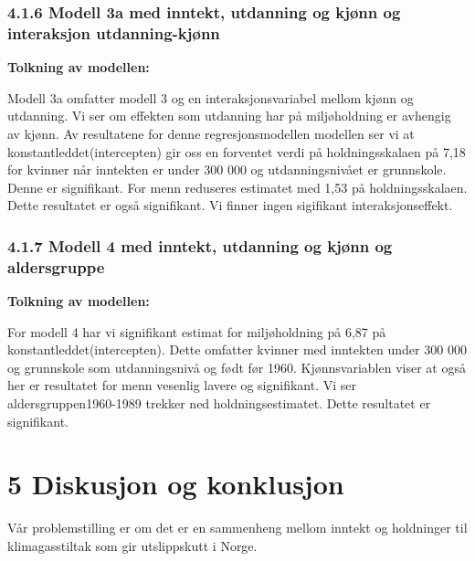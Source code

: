 \documentclass[
  12pt,
  letterpaper,
  DIV=11,
  numbers=noendperiod]{scrartcl}
\begin{document}
\hypertarget{modell-3a-med-inntekt-utdanning-og-kjuxf8nn-og-interaksjon-utdanning-kjuxf8nn}{%
\subsubsection{4.1.6 Modell 3a med inntekt, utdanning og kjønn og
interaksjon
utdanning-kjønn}\label{modell-3a-med-inntekt-utdanning-og-kjuxf8nn-og-interaksjon-utdanning-kjuxf8nn}}

\textbf{Tolkning av modellen:}

Modell 3a omfatter modell 3 og en interaksjonsvariabel mellom kjønn og
utdanning. Vi ser om effekten som utdanning har på miljøholdning er
avhengig av kjønn. Av resultatene for denne regresjonsmodellen modellen
ser vi at konstantleddet(intercepten) gir oss en forventet verdi på
holdningsskalaen på 7,18 for kvinner når inntekten er under 300 000 og
utdanningsnivået er grunnskole. Denne er signifikant. For menn reduseres
estimatet med 1,53 på holdningsskalaen. Dette resultatet er også
signifikant. Vi finner ingen sigifikant interaksjonseffekt.

\hypertarget{modell-4-med-inntekt-utdanning-og-kjuxf8nn-og-aldersgruppe}{%
\subsubsection{4.1.7 Modell 4 med inntekt, utdanning og kjønn og
aldersgruppe}\label{modell-4-med-inntekt-utdanning-og-kjuxf8nn-og-aldersgruppe}}

\textbf{Tolkning av modellen:}

For modell 4 har vi signifikant estimat for miljøholdning på 6,87 på
konstantleddet(intercepten). Dette omfatter kvinner med inntekten under
300 000 og grunnskole som utdanningsnivå og født før 1960.
Kjønnsvariablen viser at også her er resultatet for menn vesenlig lavere
og signifikant. Vi ser aldersgruppen1960-1989 trekker ned
holdningsestimatet. Dette resultatet er signifikant.

\newpage

\hypertarget{diskusjon-og-konklusjon}{%
\section{5 Diskusjon og konklusjon}\label{diskusjon-og-konklusjon}}

Vår problemstilling er om det er en sammenheng mellom inntekt og
holdninger til klimagasstiltak som gir utslippskutt i Norge.
\end{document}
